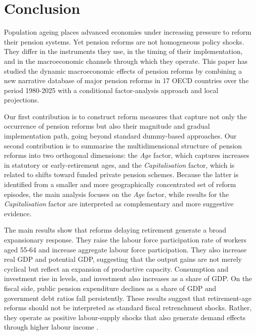 \documentclass[11pt,english,a4paper, twoside, authoryear]{article}
\begin{document}
\section{Conclusion}
\label{sec:conclusion}

Population ageing places advanced economies under increasing pressure to reform their pension systems. Yet pension reforms are not homogeneous policy shocks. They differ in the instruments they use, in the timing of their implementation, and in the macroeconomic channels through which they operate. This paper has studied the dynamic macroeconomic effects of pension reforms by combining a new narrative database of major pension reforms in 17 OECD countries over the period 1980-2025 with a conditional factor-analysis approach and local projections.

Our first contribution is to construct reform measures that capture not only the occurrence of pension reforms but also their magnitude and gradual implementation path, going beyond standard dummy-based approaches. Our second contribution is to summarise the multidimensional structure of pension reforms into two orthogonal dimensions: the \emph{Age} factor, which captures increases in statutory or early-retirement ages, and the \emph{Capitalisation} factor, which is related to shifts toward funded private pension schemes. Because the latter is identified from a smaller and more geographically concentrated set of reform episodes, the main analysis focuses on the \emph{Age} factor, while results for the \emph{Capitalisation} factor are interpreted as complementary and more suggestive evidence.

The main results show that reforms delaying retirement generate a broad expansionary response. They raise the labour force participation rate of workers aged 55-64 and increase aggregate labour force participation. They also increase real GDP and potential GDP, suggesting that the output gains are not merely cyclical but reflect an expansion of productive capacity. Consumption and investment rise in levels, and investment also increases as a share of GDP. On the fiscal side, public pension expenditure declines as a share of GDP and government debt ratios fall persistently. These results suggest that retirement-age reforms should not be interpreted as standard fiscal retrenchment shocks. Rather, they operate as positive labour-supply shocks that also generate demand effects through higher labour income%
.
\end{document}

